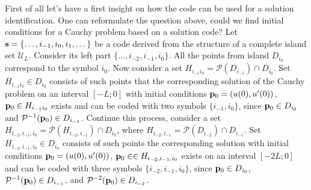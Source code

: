 First of all let's have a first insight on how the code can be used for a solution identification.
One can reformulate the question above, could we find initial conditions for a Cauchy problem based on a solution code?
Let $\vb{s} = \{ \dots, i_{-1}, i_0, i_1, \dots \}$ be a code derived from the structure of a complete island set $\mathscr{U}_L$.
Consider its left part $\{ \dots, i_{-2}, i_{-1}, i_0 \}$.
All the points from island $D_{i_0}$ correspond to the symbol $i_0$.
Now consider a set $H_{i_{-1} i_0} = \mathcal{P}(D_{i_{-1}}) \cap D_{i_0}$.
Set $H_{i_{-1} i_0} \in D_{i_0}$ consists of such points that the corresponding solution of the Cauchy problem on an interval $[-L; 0]$ with initial conditions $\vb{p}_0 = (u(0), u'(0))$, $\vb{p}_0 \in H_{i_{-1} i_0}$ exists and can be coded with two symbols $\{ i_{-1}, i_0 \}$, since $\vb{p}_0 \in D_{i_0}$ and $\mathcal{P}^{-1}(\vb{p}_0) \in D_{i_{-1}}$.
Continue this process, consider a set $H_{i_{-2}, i_{-1}, i_0} = \mathcal{P}(H_{i_{-2}, i_{-1}}) \cap D_{i_0}$, where $H_{i_{-2}, i_{-1}} = \mathcal{P}(D_{i_{-2}}) \cap D_{i_{-1}}$.
Set $H_{i_{-2}, i_{-1}, i_0} \in D_{i_0}$ consists of such points the corresponding solution with initial conditions $\vb{p}_0 = (u(0), u'(0))$, $\vb{p}_0 \in  \in H_{i_{-2}, i_{-1}, i_0}$ exists on an interval $[-2L; 0]$ and can be coded with three symbols $\{ i_{-2}, i_{-1}, i_0 \}$, since $\vb{p}_0 \in D_{i_0}$, $\mathcal{P}^{-1}(\vb{p}_0) \in D_{i_{-1}}$, and $\mathcal{P}^{-2}(\vb{p}_0) \in D_{i_{-2}}$.

